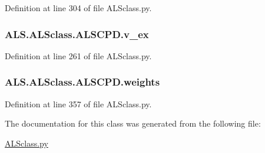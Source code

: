 Definition at line 304 of file A\+L\+Sclass.\+py.

\hypertarget{class_a_l_s_1_1_a_l_sclass_1_1_a_l_s_c_p_d_ab40ad1c47e031156f30bcb05e9674e65}{
\subsubsection[{v\+\_\+ex}]{\setlength{\rightskip}{0pt plus 5cm}A\+L\+S.\+A\+L\+Sclass.\+A\+L\+S\+C\+P\+D.\+v\+\_\+ex}}\label{class_a_l_s_1_1_a_l_sclass_1_1_a_l_s_c_p_d_ab40ad1c47e031156f30bcb05e9674e65}


Definition at line 261 of file A\+L\+Sclass.\+py.

\hypertarget{class_a_l_s_1_1_a_l_sclass_1_1_a_l_s_c_p_d_a07adddd4720dba6e1a8d3187174023a7}{
\subsubsection[{weights}]{\setlength{\rightskip}{0pt plus 5cm}A\+L\+S.\+A\+L\+Sclass.\+A\+L\+S\+C\+P\+D.\+weights}}\label{class_a_l_s_1_1_a_l_sclass_1_1_a_l_s_c_p_d_a07adddd4720dba6e1a8d3187174023a7}


Definition at line 357 of file A\+L\+Sclass.\+py.



The documentation for this class was generated from the following file\+:\begin{DoxyCompactItemize}
\item 
\hyperlink{_a_l_sclass_8py}{A\+L\+Sclass.\+py}\end{DoxyCompactItemize}
